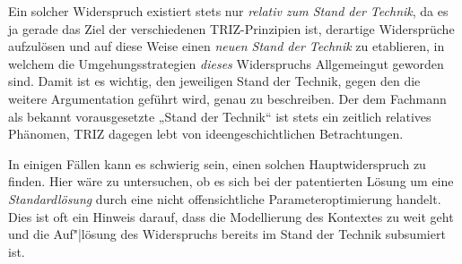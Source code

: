 \documentclass[11pt,a4paper]{article}
\begin{document}
Ein solcher Widerspruch existiert stets nur \emph{relativ zum Stand der
  Technik}, da es ja gerade das Ziel der verschiedenen TRIZ-Prinzipien ist,
derartige Widersprüche aufzulösen und auf diese Weise einen \emph{neuen Stand
  der Technik} zu etablieren, in welchem die Umgehungsstrategien \emph{dieses}
Widerspruchs Allgemeingut geworden sind.  Damit ist es wichtig, den jeweiligen
Stand der Technik, gegen den die weitere Argumentation geführt wird, genau zu
beschreiben.  Der dem Fachmann als bekannt vorausgesetzte „Stand der Technik“
ist stets ein zeitlich relatives Phänomen, TRIZ dagegen lebt von
ideengeschichtlichen Betrachtungen.

In einigen Fällen kann es schwierig sein, einen solchen Hauptwiderspruch zu
finden.  Hier wäre zu untersuchen, ob es sich bei der patentierten Lösung um
eine \emph{Standardlösung} durch eine nicht offensichtliche
Parameteroptimierung handelt.  Dies ist oft ein Hinweis darauf, dass die
Modellierung des Kontextes zu weit geht und die Auf"|lösung des Widerspruchs
bereits im Stand der Technik subsumiert ist.
\end{document}
